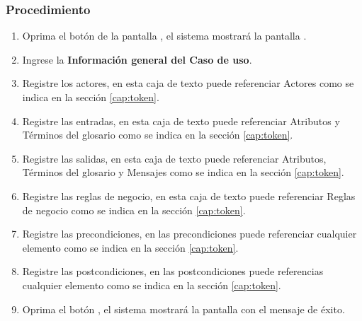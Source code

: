 \subsubsection{Procedimiento}
\begin{enumerate}
	\item Oprima el botón  de la pantalla , el sistema mostrará la pantalla . 

	
	\item Ingrese la \textbf{Información general del Caso de uso}.
	
	\item Registre los actores, en esta caja de texto puede referenciar Actores como se indica en la sección \ref{cap:token}.
	
	\item Registre las entradas, en esta caja de texto puede referenciar Atributos y Términos del glosario como se indica en la sección \ref{cap:token}.
	
	\item Registre las salidas, en esta caja de texto puede referenciar Atributos, Términos del glosario y Mensajes como se indica en la sección \ref{cap:token}.
	
	\item Registre las reglas de negocio, en esta caja de texto puede referenciar Reglas de negocio como se indica en la sección \ref{cap:token}.
	
	\item Registre las precondiciones, en las precondiciones puede referenciar cualquier elemento como se indica en la sección \ref{cap:token}.
	
	\item Registre las postcondiciones, en las postcondiciones puede referencias cualquier elemento como se indica en la sección \ref{cap:token}.
	
	\item Oprima el botón , el sistema mostrará la pantalla  con el mensaje de éxito.
\end{enumerate}


